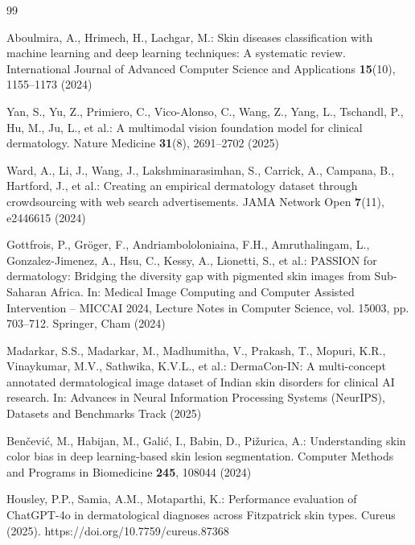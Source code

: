 \documentclass[VANCOUVER,twocolumn]{USG}
\begin{document}
\begin{thebibliography}{99}

Aboulmira, A., Hrimech, H., Lachgar, M.: Skin diseases classification with machine learning
and deep learning techniques: A systematic review. International Journal of Advanced Computer
Science and Applications \textbf{15}(10), 1155--1173 (2024)

Yan, S., Yu, Z., Primiero, C., Vico-Alonso, C., Wang, Z., Yang, L., Tschandl, P., Hu, M.,
Ju, L., et al.: A multimodal vision foundation model for clinical dermatology. Nature Medicine
\textbf{31}(8), 2691--2702 (2025)

Ward, A., Li, J., Wang, J., Lakshminarasimhan, S., Carrick, A., Campana, B., Hartford, J.,
et al.: Creating an empirical dermatology dataset through crowdsourcing with web search
advertisements. JAMA Network Open \textbf{7}(11), e2446615 (2024)

Gottfrois, P., Gr\"{o}ger, F., Andriambololoniaina, F.H., Amruthalingam, L.,
Gonzalez-Jimenez, A., Hsu, C., Kessy, A., Lionetti, S., et al.: PASSION for dermatology:
Bridging the diversity gap with pigmented skin images from Sub-Saharan Africa. In: Medical
Image Computing and Computer Assisted Intervention -- MICCAI 2024, Lecture Notes in Computer
Science, vol. 15003, pp. 703--712. Springer, Cham (2024)

Madarkar, S.S., Madarkar, M., Madhumitha, V., Prakash, T., Mopuri, K.R., Vinaykumar, M.V.,
Sathwika, K.V.L., et al.: DermaCon-IN: A multi-concept annotated dermatological image dataset
of Indian skin disorders for clinical AI research. In: Advances in Neural Information
Processing Systems (NeurIPS), Datasets and Benchmarks Track (2025)

Ben\v{c}evi\'{c}, M., Habijan, M., Gali\'{c}, I., Babin, D., Pi\v{z}urica, A.: Understanding
skin color bias in deep learning-based skin lesion segmentation. Computer Methods and Programs
in Biomedicine \textbf{245}, 108044 (2024)

Housley, P.P., Samia, A.M., Motaparthi, K.: Performance evaluation of ChatGPT-4o in
dermatological diagnoses across Fitzpatrick skin types. Cureus (2025).
https://doi.org/10.7759/cureus.87368


\end{thebibliography}
\end{document}
